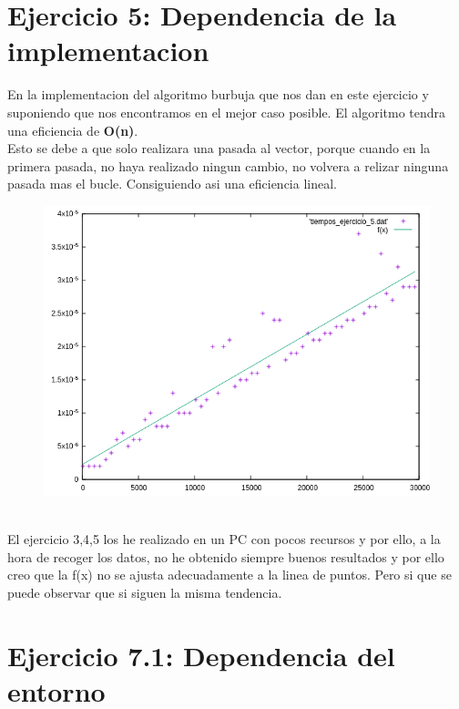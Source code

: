 \documentclass[12pt,a4psprt]{article}
\begin{document}
\section{Ejercicio 5: Dependencia de la implementacion}
En la implementacion del algoritmo burbuja que nos dan en este ejercicio y suponiendo que nos encontramos en el mejor caso posible. El algoritmo tendra una eficiencia de \textbf{O(n)}.
\\Esto se debe a que solo realizara una pasada al vector, porque cuando en la primera pasada, no haya realizado ningun cambio, no volvera a relizar ninguna pasada mas el bucle. Consiguiendo asi una eficiencia lineal.
\begin{figure}[h]
\begin{center}
	\includegraphics[scale=1]{image/grafica_5.png}
\end{center}
\end{figure}
\\
El ejercicio 3,4,5 los he realizado en un PC con pocos recursos y por ello, a la hora de recoger los datos, no he obtenido siempre buenos resultados y por ello creo que la f(x) no se ajusta adecuadamente a la linea de puntos. Pero si que se puede observar que si siguen la misma tendencia.
\section{Ejercicio 7.1: Dependencia del entorno}
\end{document}
